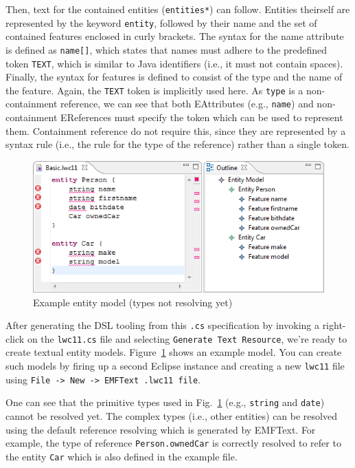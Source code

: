 \documentclass[10pt, pdftex]{llncs}
\begin{document}
Then, text for the contained entities (\texttt{entities*}) can follow. Entities
theirself are represented by the keyword \texttt{entity}, followed by their name
and the set of contained features enclosed in curly brackets. The syntax for the
name attribute is defined as \texttt{name[]}, which states that names must
adhere to the predefined token \texttt{TEXT}, which is similar to Java identifiers
(i.e., it must not contain spaces). Finally, the syntax for features is defined
to consist of the type and the name of the feature. Again, the \texttt{TEXT}
token is implicitly used here. As \texttt{type} is a non-containment reference,
we can see that both EAttributes (e.g., \texttt{name}) and non-containment
EReferences must specify the token which can be used to represent them. Containment reference do not require this,
since they are represented by a syntax rule (i.e., the rule for the type of the
reference) rather than a single token.

\begin{figure}
	\centering
	\includegraphics[width=1.00\textwidth]{figures/examplefile1.png}
	\caption{Example entity model (types not resolving yet)}
	\label{fig:example1}
\end{figure}

After generating the DSL tooling from this \texttt{.cs} specification by
invoking a right-click on the \texttt{lwc11.cs} file and selecting
\texttt{Generate Text Resource}, we're ready to create textual entity models.
Figure~\ref{fig:example1} shows an example model. You can create such models by
firing up a second Eclipse instance and creating a new \texttt{lwc11} file using
\texttt{File -> New -> EMFText .lwc11 file}.

One can see that the primitive types used in Fig.~\ref{fig:example1} (e.g.,
\texttt{string} and \texttt{date}) cannot be resolved yet. The complex types
(i.e., other entities) can be resolved using the default reference resolving
which is generated by EMFText. For example, the type of reference
\texttt{Person.ownedCar} is correctly resolved to refer to the entity
\texttt{Car} which is also defined in the example file.
\end{document}
